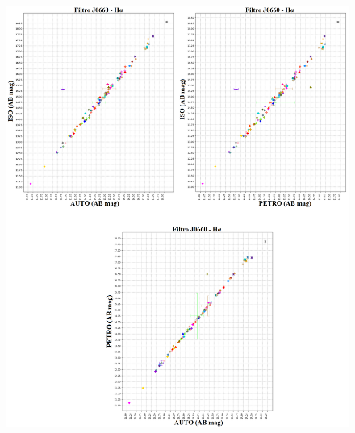 \begin{anexosenv}
    \begin{figure}[h]
        \centering
        \includegraphics[width=1.0\textwidth]{Imagens/J0660_iso_auto.png}
        \caption[]{}
        \label{fig:J0660_iso_auto} 
    \end{figure}


\end{anexosenv}

